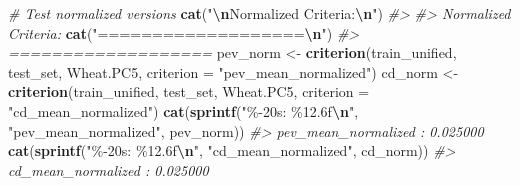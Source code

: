 \documentclass[
]{article}
\newenvironment{Shaded}{\begin{snugshade}}{\end{snugshade}}
\newcommand{\AttributeTok}[1]{\textcolor[rgb]{0.13,0.29,0.53}{#1}}
\newcommand{\CommentTok}[1]{\textcolor[rgb]{0.56,0.35,0.01}{\textit{#1}}}
\newcommand{\FunctionTok}[1]{\textcolor[rgb]{0.13,0.29,0.53}{\textbf{#1}}}
\newcommand{\NormalTok}[1]{#1}
\newcommand{\OtherTok}[1]{\textcolor[rgb]{0.56,0.35,0.01}{#1}}
\newcommand{\SpecialCharTok}[1]{\textcolor[rgb]{0.81,0.36,0.00}{\textbf{#1}}}
\newcommand{\StringTok}[1]{\textcolor[rgb]{0.31,0.60,0.02}{#1}}
\begin{document}
\begin{Shaded}
\begin{Highlighting}[]
\CommentTok{\# Test normalized versions}
\FunctionTok{cat}\NormalTok{(}\StringTok{"}\SpecialCharTok{\textbackslash{}n}\StringTok{Normalized Criteria:}\SpecialCharTok{\textbackslash{}n}\StringTok{"}\NormalTok{)}
\CommentTok{\#\textgreater{} }
\CommentTok{\#\textgreater{} Normalized Criteria:}
\FunctionTok{cat}\NormalTok{(}\StringTok{"===================}\SpecialCharTok{\textbackslash{}n}\StringTok{"}\NormalTok{)}
\CommentTok{\#\textgreater{} ===================}
\NormalTok{pev\_norm }\OtherTok{\textless{}{-}} \FunctionTok{criterion}\NormalTok{(train\_unified, test\_set, Wheat.PC5, }\AttributeTok{criterion =} \StringTok{"pev\_mean\_normalized"}\NormalTok{)}
\NormalTok{cd\_norm }\OtherTok{\textless{}{-}} \FunctionTok{criterion}\NormalTok{(train\_unified, test\_set, Wheat.PC5, }\AttributeTok{criterion =} \StringTok{"cd\_mean\_normalized"}\NormalTok{)}
\FunctionTok{cat}\NormalTok{(}\FunctionTok{sprintf}\NormalTok{(}\StringTok{"\%{-}20s: \%12.6f}\SpecialCharTok{\textbackslash{}n}\StringTok{"}\NormalTok{, }\StringTok{"pev\_mean\_normalized"}\NormalTok{, pev\_norm))}
\CommentTok{\#\textgreater{} pev\_mean\_normalized :     0.025000}
\FunctionTok{cat}\NormalTok{(}\FunctionTok{sprintf}\NormalTok{(}\StringTok{"\%{-}20s: \%12.6f}\SpecialCharTok{\textbackslash{}n}\StringTok{"}\NormalTok{, }\StringTok{"cd\_mean\_normalized"}\NormalTok{, cd\_norm))}
\CommentTok{\#\textgreater{} cd\_mean\_normalized  :     0.025000}


\end{Highlighting}
\end{Shaded}
\end{document}
